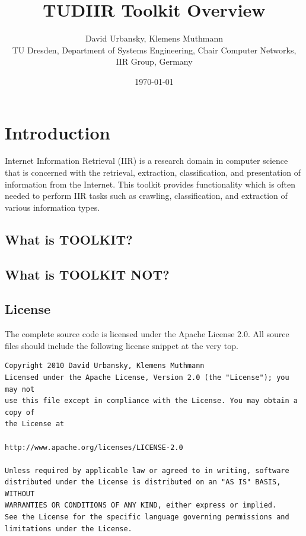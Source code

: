 \documentclass[a4paper,twoside]{book}      %
\date{\today}
\title{TUDIIR Toolkit Overview}
\author{David Urbansky, Klemens Muthmann \\
{\small TU Dresden, Department of Systems Engineering, Chair Computer Networks, IIR Group, Germany}
}
\begin{document}
\maketitle

\tableofcontents

\chapter{Introduction}
Internet Information Retrieval (IIR) is a research domain in computer science that is concerned with the retrieval, extraction, classification, and presentation of information from the Internet. This toolkit provides functionality which is often needed to perform IIR tasks such as crawling, classification, and extraction of various information types.

\section{What is TOOLKIT?}
\section{What is TOOLKIT NOT?}

\section{License}
The complete source code is licensed under the Apache License 2.0. All source files should include the following license snippet at the very top.

\begin{verbatim}
Copyright 2010 David Urbansky, Klemens Muthmann
Licensed under the Apache License, Version 2.0 (the "License"); you may not
use this file except in compliance with the License. You may obtain a copy of
the License at

http://www.apache.org/licenses/LICENSE-2.0

Unless required by applicable law or agreed to in writing, software
distributed under the License is distributed on an "AS IS" BASIS, WITHOUT
WARRANTIES OR CONDITIONS OF ANY KIND, either express or implied.
See the License for the specific language governing permissions and
limitations under the License.
\end{verbatim}
\end{document}
